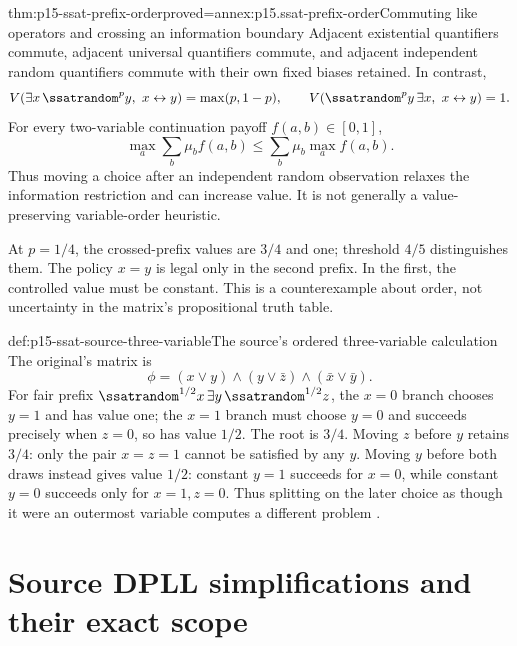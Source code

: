 \begin{hbtheorem}{thm:p15-ssat-prefix-order}{proved=annex:p15.ssat-prefix-order}{Commuting like operators and crossing an information boundary}
Adjacent existential quantifiers commute, adjacent universal quantifiers
commute, and adjacent independent random quantifiers commute with their
own fixed biases retained. In contrast,
\[
 V(\exists x\,\ssatrandom^p y,\ x\leftrightarrow y)=\max(p,1-p),
 \qquad
 V(\ssatrandom^p y\,\exists x,\ x\leftrightarrow y)=1.
\]
For every two-variable continuation payoff \(f(a,b)\in[0,1]\),
\[
 \max_a\sum_b\mu_bf(a,b)
       \leq\sum_b\mu_b\max_af(a,b).
\]
Thus moving a choice after an independent random observation relaxes
the information restriction and can increase value. It is not generally
a value-preserving variable-order heuristic.
\end{hbtheorem}

At \(p=1/4\), the crossed-prefix values are \(3/4\) and one;
threshold \(4/5\) distinguishes them. The policy \(x=y\) is legal
only in the second prefix. In the first, the controlled value must be
constant. This is a counterexample about order, not uncertainty in the
matrix's propositional truth table.

\begin{hbexample}{def:p15-ssat-source-three-variable}{The source's ordered three-variable calculation}
The original's matrix is
\[
 \phi=(x\lor y)\land(y\lor\bar z)\land(\bar x\lor\bar y).
\]
For fair prefix \(\ssatrandom^{1/2}x\,\exists y\,\ssatrandom^{1/2}z\),
the \(x=0\) branch chooses \(y=1\) and has value one;
the \(x=1\) branch must choose \(y=0\) and succeeds precisely
when \(z=0\), so has value \(1/2\). The root is \(3/4\).
Moving \(z\) before \(y\) retains \(3/4\): only the pair
\(x=z=1\) cannot be satisfied by any \(y\). Moving \(y\)
before both draws instead gives value \(1/2\): constant \(y=1\)
succeeds for \(x=0\), while constant \(y=0\) succeeds only for
\(x=1,z=0\). Thus splitting on the later choice as though it were
an outermost variable computes a different problem
\cite[pp.~4,37]{LittmanMajercikPitassi2000SSATAuthor}.
\end{hbexample}

\section{Source DPLL simplifications and their exact scope}
\label{sec:p15-ssat-dpll}

